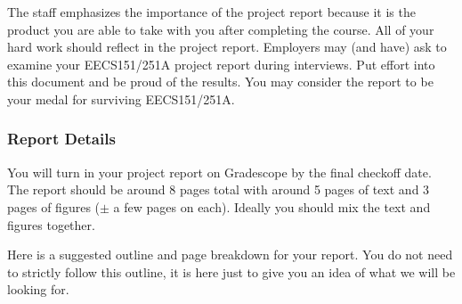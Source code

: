 \documentclass[11pt]{article}
\begin{document}
The staff emphasizes the importance of the project report because it is the product you are able to take with you after completing the course.  All of your hard work should reflect in the project report. Employers may (and have) ask to examine your EECS151/251A project report during interviews. Put effort into this document and be proud of the results. You may consider the report to be your medal for surviving EECS151/251A.

\subsubsection{Report Details}
You will turn in your project report on Gradescope by the final checkoff date. The report should be around 8 pages total with around 5 pages of text and 3 pages of figures ($\pm$ a few pages on each). Ideally you should mix the text and figures together.

Here is a suggested outline and page breakdown for your report. You do not need to strictly follow this outline, it is here just to give you an idea of what we will be looking for.
\end{document}
